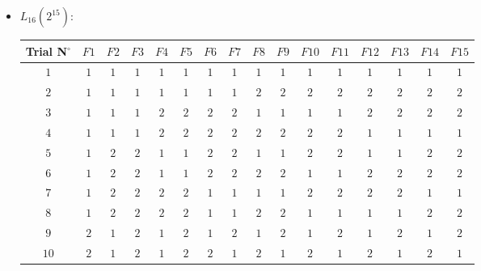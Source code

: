 \begin{itemize}
		\item $L_{16} (2^{15})$:
		\begin{table}[H]\centering
			\begin{center}
			\begin{tabular}{|c|c|c|c|c|c|c|c|c|c|c|c|c|c|c|c|}
			\hline
			\multicolumn{1}{c}{\cellcolor{black!30}\textbf{Trial N${}^\circ$}} & 
			\multicolumn{1}{c}{\cellcolor{black!30}$F1$} & 
			\multicolumn{1}{c}{\cellcolor{black!30}$F2$} & 
			\multicolumn{1}{c}{\cellcolor{black!30}$F3$} & 
			\multicolumn{1}{c}{\cellcolor{black!30}$F4$} & 
			\multicolumn{1}{c}{\cellcolor{black!30}$F5$} & 
			\multicolumn{1}{c}{\cellcolor{black!30}$F6$} & 
			\multicolumn{1}{c}{\cellcolor{black!30}$F7$} & 
			\multicolumn{1}{c}{\cellcolor{black!30}$F8$} & 
			\multicolumn{1}{c}{\cellcolor{black!30}$F9$} & 
			\multicolumn{1}{c}{\cellcolor{black!30}$F10$} & 
			\multicolumn{1}{c}{\cellcolor{black!30}$F11$} & 
			\multicolumn{1}{c}{\cellcolor{black!30}$F12$} & 
			\multicolumn{1}{c}{\cellcolor{black!30}$F13$} & 
			\multicolumn{1}{c}{\cellcolor{black!30}$F14$} & 
			\multicolumn{1}{c}{\cellcolor{black!30}$F15$}\\ \hline
		  	$1$ & $1$ & $1$ & $1$ & $1$ & $1$ & $1$ & $1$ & $1$ & $1$ & $1$ & $1$ & $1$ & $1$ & $1$ & $1$\\ \hline
			$2$ & $1$ & $1$ & $1$ & $1$ & $1$ & $1$ & $1$ & $2$ & $2$ & $2$ & $2$ & $2$ & $2$ & $2$ & $2$\\ \hline
			$3$ & $1$ & $1$ & $1$ & $2$ & $2$ & $2$ & $2$ & $1$ & $1$ & $1$ & $1$ & $2$ & $2$ & $2$ & $2$\\ \hline	
			$4$ & $1$ & $1$ & $1$ & $2$ & $2$ & $2$ & $2$ & $2$ & $2$ & $2$ & $2$ & $1$ & $1$ & $1$ & $1$\\ \hline	
			$5$ & $1$ & $2$ & $2$ & $1$ & $1$ & $2$ & $2$ & $1$ & $1$ & $2$ & $2$ & $1$ & $1$ & $2$ & $2$\\ \hline	
			$6$ & $1$ & $2$ & $2$ & $1$ & $1$ & $2$ & $2$ & $2$ & $2$ & $1$ & $1$ & $2$ & $2$ & $2$ & $2$\\ \hline	
			$7$ & $1$ & $2$ & $2$ & $2$ & $2$ & $1$ & $1$ & $1$ & $1$ & $2$ & $2$ & $2$ & $2$ & $1$ & $1$\\ \hline
			$8$ & $1$ & $2$ & $2$ & $2$ & $2$ & $1$ & $1$ & $2$ & $2$ & $1$ & $1$ & $1$ & $1$ & $2$ & $2$\\ \hline
			$9$ & $2$ & $1$ & $2$ & $1$ & $2$ & $1$ & $2$ & $1$ & $2$ & $1$ & $2$ & $1$ & $2$ & $1$ & $2$\\ \hline
			$10$ & $2$ & $1$ & $2$ & $1$ & $2$ & $2$ & $1$ & $2$ & $1$ & $2$ & $1$ & $2$ & $1$ & $2$ & $1$\\ \hline

\end{tabular}
\end{center}
\end{table}
\end{itemize}
